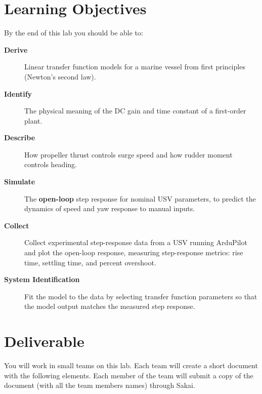 \documentclass[../../book.tex]{subfiles}
\begin{document}
\graphicspath{{images/}}

\section{Learning Objectives}

By the end of this lab you should be able to:

\begin{description}
  \item[\textbf{Derive}] Linear transfer function models for a marine vessel from first principles (Newton's second law).
  \item[\textbf{Identify}] The physical meaning of the DC gain and time constant of a first-order plant.
  \item[\textbf{Describe}] How propeller thrust controls surge speed and how rudder moment controls heading.
  \item[\textbf{Simulate}] The \textbf{open-loop} step response for nominal USV parameters, to predict the dynamics of speed and yaw response to manual inputs.
  \item[\textbf{Collect}] Collect experimental step-response data from a USV running ArduPilot and plot the open-loop response, measuring step-response metrics: rise time, settling time, and percent overshoot.
  \item[\textbf{System Identification}] Fit the model to the data by selecting transfer function parameters so that the model output matches the measured step response.
\end{description}


\section{Deliverable}

You will work in small teams on this lab.  Each team will create a short document with the following elements.  Each member of the team will submit a copy of the document (with all the team members names) through Sakai.
\end{document}
